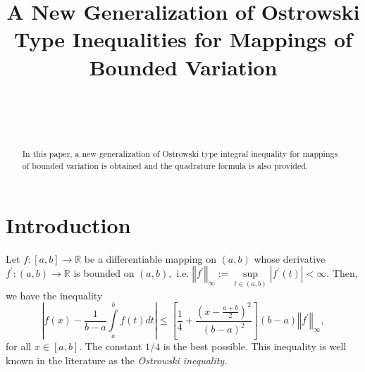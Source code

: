 \documentclass[
11pt,%
tightenlines,%
twoside,%
onecolumn,%
nofloats,%
nobibnotes,%
nofootinbib,%
superscriptaddress,%
noshowpacs,%
centertags]%
{revtex4}
\begin{document}

\title{A New Generalization of Ostrowski Type Inequalities for Mappings of Bounded
Variation}

\author{~}

\author{~}





\begin{abstract}
In this paper, a new generalization of Ostrowski type integral inequality
for mappings of bounded variation is obtained and the quadrature formula is
also provided.
\end{abstract}
 

\maketitle



\section{Introduction}

Let $f:\left[ a,b\right] \rightarrow
\mathbb{R}
$ be a differentiable mapping on $\left( a,b\right) $ whose derivative $%
f^{\prime }:\left( a,b\right) \rightarrow
\mathbb{R}
$ is bounded on $\left( a,b\right) ,$ i.e. $\left\Vert f^{\prime
}\right\Vert _{\infty }:=\sup\limits_{t\in \left( a,b\right) }\left\vert
f^{\prime }(t)\right\vert <\infty .$ Then, we have the inequality%
\begin{equation}
\left\vert f(x)-\frac{1}{b-a}\int\limits_{a}^{b}f(t)dt\right\vert \leq \left[
\frac{1}{4}+\frac{\left( x-\frac{a+b}{2}\right) ^{2}}{\left( b-a\right) ^{2}}%
\right] \left( b-a\right) \left\Vert f^{\prime }\right\Vert _{\infty },
\label{E1}
\end{equation}%
for all $x\in \left[ a,b\right] $\cite{ostrowski}. The constant
$1/4$ is the best possible. This inequality is well known in the
literature as the \textit{Ostrowski inequality.}
\end{document}
